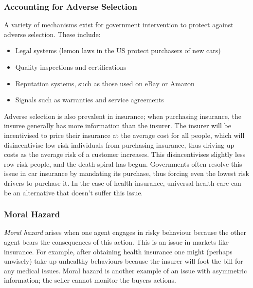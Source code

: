 \documentclass[12pt]{report}
\begin{document}
\subsubsection*{Accounting for Adverse Selection}
A variety of mechanisms exist for government intervention to protect against
adverse selection. These include:
\begin{itemize}
    \item Legal systems (lemon laws in the US protect purchasers of new cars)
    \item Quality inspections and certifications
    \item Reputation systems, such as those used on eBay or Amazon
    \item Signals such as warranties and service agreements
\end{itemize}

\bigskip
Adverse selection is also prevalent in insurance; when purchasing insurance,
the insuree generally has more information than the insurer. The insurer will
be incentivised to price their insurance at the average cost for all people,
which will disincentivise low risk individuals from purchasing insurance, thus
driving up costs as the average risk of a customer increases. This 
disincentivises slightly less row risk people, and the death spiral has begun.
Governments often resolve this issue in car insurance by mandating its purchase,
thus forcing even the lowest risk drivers to purchase it. In the case of 
health insurance, universal health care can be an alternative that doesn't
suffer this issue.

\subsubsection*{Moral Hazard}
\textit{Moral hazard} arises when one agent engages in risky behaviour because
the other agent bears the consequences of this action. This is an issue in
markets like insurance. For example, after obtaining health insurance one might
(perhaps unwisely) take up unhealthy behaviours because the insurer will foot
the bill for any medical issues. Moral hazard is another example of an issue
with asymmetric information; the seller cannot monitor the buyers actions.
\end{document}
